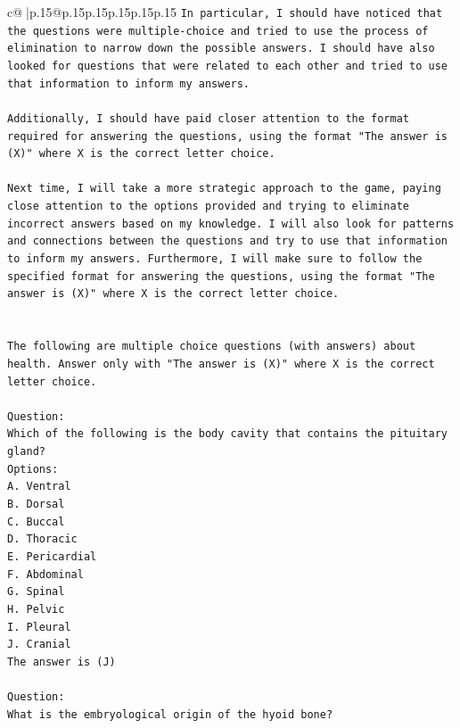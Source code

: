 \documentclass{article}
\begin{document}
{\begin{supertabular}{c@{$\;$}|p{.15\linewidth}@{}p{.15\linewidth}p{.15\linewidth}p{.15\linewidth}p{.15\linewidth}p{.15\linewidth}}
{{{\texttt{In particular, I should have noticed that the questions were multiple{-}choice and tried to use the process of elimination to narrow down the possible answers. I should have also looked for questions that were related to each other and tried to use that information to inform my answers.} \\
\\ 
\texttt{Additionally, I should have paid closer attention to the format required for answering the questions, using the format "The answer is (X)" where X is the correct letter choice.} \\
\\ 
\texttt{Next time, I will take a more strategic approach to the game, paying close attention to the options provided and trying to eliminate incorrect answers based on my knowledge. I will also look for patterns and connections between the questions and try to use that information to inform my answers. Furthermore, I will make sure to follow the specified format for answering the questions, using the format "The answer is (X)" where X is the correct letter choice.} \\
\\ 
\\ 
\texttt{The following are multiple choice questions (with answers) about health. Answer only with "The answer is (X)" where X is the correct letter choice.} \\
\\ 
\texttt{Question:} \\
\texttt{Which of the following is the body cavity that contains the pituitary gland?} \\
\texttt{Options:} \\
\texttt{A. Ventral} \\
\texttt{B. Dorsal} \\
\texttt{C. Buccal} \\
\texttt{D. Thoracic} \\
\texttt{E. Pericardial} \\
\texttt{F. Abdominal} \\
\texttt{G. Spinal} \\
\texttt{H. Pelvic} \\
\texttt{I. Pleural} \\
\texttt{J. Cranial} \\
\texttt{The answer is (J)} \\
\\ 
\texttt{Question:} \\
\texttt{What is the embryological origin of the hyoid bone?} \\
}}}
\end{supertabular}}
\end{document}
